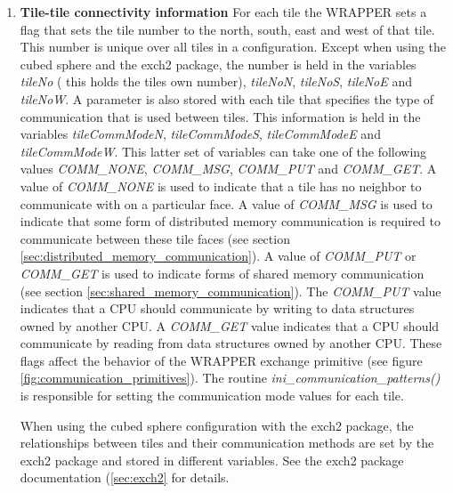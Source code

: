 \begin{enumerate}
\item {\bf Tile-tile connectivity information}
  For each tile the WRAPPER sets a flag that sets the tile number to
  the north, south, east and west of that tile. This number is unique
  over all tiles in a configuration. Except when using the cubed
  sphere and the exch2 package, the number is held in the variables
  {\em tileNo} ( this holds the tiles own number), {\em tileNoN}, {\em
    tileNoS}, {\em tileNoE} and {\em tileNoW}. A parameter is also
  stored with each tile that specifies the type of communication that
  is used between tiles.  This information is held in the variables
  {\em tileCommModeN}, {\em tileCommModeS}, {\em tileCommModeE} and
  {\em tileCommModeW}.  This latter set of variables can take one of
  the following values {\em COMM\_NONE}, {\em COMM\_MSG}, {\em
    COMM\_PUT} and {\em COMM\_GET}.  A value of {\em COMM\_NONE} is
  used to indicate that a tile has no neighbor to communicate with on
  a particular face. A value of {\em COMM\_MSG} is used to indicate
  that some form of distributed memory communication is required to
  communicate between these tile faces (see section
  \ref{sec:distributed_memory_communication}).  A value of {\em
    COMM\_PUT} or {\em COMM\_GET} is used to indicate forms of shared
  memory communication (see section
  \ref{sec:shared_memory_communication}). The {\em COMM\_PUT} value
  indicates that a CPU should communicate by writing to data
  structures owned by another CPU. A {\em COMM\_GET} value indicates
  that a CPU should communicate by reading from data structures owned
  by another CPU. These flags affect the behavior of the WRAPPER
  exchange primitive (see figure \ref{fig:communication_primitives}).
  The routine {\em ini\_communication\_patterns()} is responsible for
  setting the communication mode values for each tile.

  When using the cubed sphere configuration with the exch2 package,
  the relationships between tiles and their communication methods are
  set by the exch2 package and stored in different variables.  See the
  exch2 package documentation (\ref{sec:exch2} for details.

 \\


\end{enumerate}
